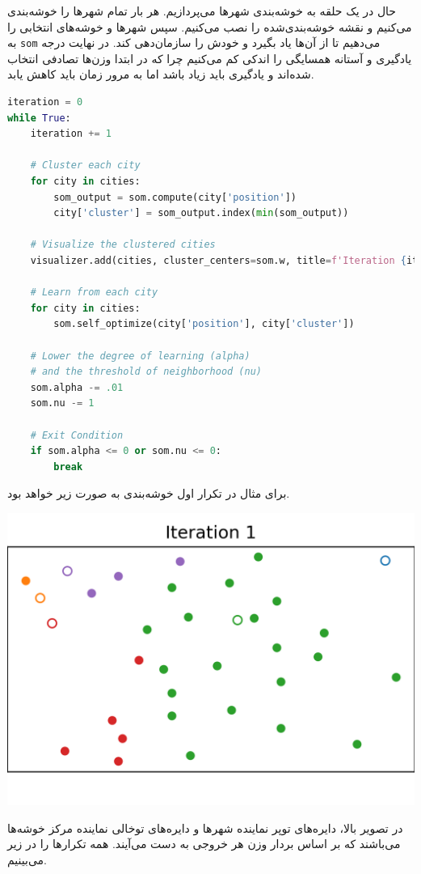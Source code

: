\documentclass[a4paper, 12pt]{article}
\theoremstyle{definition}
\begin{document}
حال در یک حلقه به خوشه‌بندی شهرها می‌پردازیم. هر بار تمام شهرها را خوشه‌بندی می‌کنیم و نقشه خوشه‌بندی‌شده را نصب می‌کنیم. سپس شهرها و خوشه‌های انتخابی را به
\texttt{som}
می‌دهیم تا از آن‌ها یاد بگیرد و خودش را سازمان‌دهی کند. در نهایت درجه یادگیری و آستانه همسایگی را اندکی کم می‌کنیم چرا که در ابتدا وزن‌ها تصادفی انتخاب شده‌اند و یادگیری باید زیاد باشد اما به مرور زمان باید کاهش یابد.

\LTR
\begin{lstlisting}[language=Python]
iteration = 0
while True:
    iteration += 1

    # Cluster each city
    for city in cities:
        som_output = som.compute(city['position'])
        city['cluster'] = som_output.index(min(som_output))

    # Visualize the clustered cities
    visualizer.add(cities, cluster_centers=som.w, title=f'Iteration {iteration}')

    # Learn from each city
    for city in cities:
        som.self_optimize(city['position'], city['cluster'])

    # Lower the degree of learning (alpha)
    # and the threshold of neighborhood (nu)
    som.alpha -= .01
    som.nu -= 1

    # Exit Condition
    if som.alpha <= 0 or som.nu <= 0:
        break
\end{lstlisting}
\RTL

برای مثال در تکرار اول خوشه‌بندی به صورت زیر خواهد بود.

\begin{center}
    \includegraphics[width=.5\textwidth]{1/1.png}
\end{center}

در تصویر بالا، دایره‌های توپر نماینده شهر‌ها و دایره‌های توخالی نماینده مرکز خوشه‌ها می‌باشند که بر اساس بردار وزن هر خروجی به دست می‌آیند. همه تکرارها را در زیر می‌بینیم.
\end{document}

